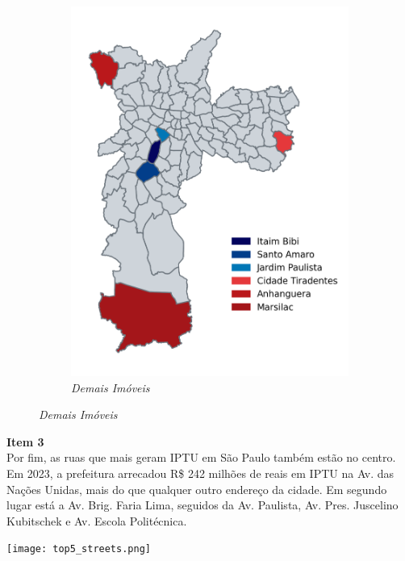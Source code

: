 \documentclass[12pt,a4paper]{article}
\theoremstyle{break}
\begin{document}
\begin{figure}[htbp]
\begin{subfigure}[b]{0.32\textwidth}
    \includegraphics[width=\textwidth]{q2_c.png}
    \caption*{\emph{Demais Imóveis}}
  \end{subfigure}
\end{figure}

\textbf{Item 3}\\
\ident Por fim, as ruas que mais geram IPTU em São Paulo também estão no centro. Em 2023, a prefeitura arrecadou R\$ 242 milhões de reais em IPTU na Av. das Nações Unidas, mais do que qualquer outro endereço da cidade. Em segundo lugar está a Av. Brig. Faria Lima, seguidos da Av. Paulista, Av. Pres. Juscelino Kubitschek e Av. Escola Politécnica.\\

\begin{center}
    \texttt{[image: top5\_streets.png]}
\end{center}
\end{document}
